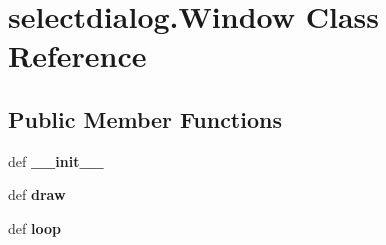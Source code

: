 \hypertarget{classselectdialog_1_1Window}{\section{selectdialog.\-Window Class Reference}
\label{classselectdialog_1_1Window}
}
\subsection*{Public Member Functions}
\begin{DoxyCompactItemize}
\item 
\hypertarget{classselectdialog_1_1Window_a4aed47eb64a7fda5d4350375702f0a94}{def {\bfseries \-\_\-\-\_\-init\-\_\-\-\_\-}}\label{classselectdialog_1_1Window_a4aed47eb64a7fda5d4350375702f0a94}

\item 
\hypertarget{classselectdialog_1_1Window_a58114bdf1bcb10b3545775bef7898718}{def {\bfseries draw}}\label{classselectdialog_1_1Window_a58114bdf1bcb10b3545775bef7898718}

\item 
\hypertarget{classselectdialog_1_1Window_acb02a8142ed86ebb264b8a9f917c9aff}{def {\bfseries loop}}\label{classselectdialog_1_1Window_acb02a8142ed86ebb264b8a9f917c9aff}

\end{DoxyCompactItemize}
